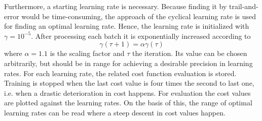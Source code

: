 Furthermore, a starting learning rate is necessary.
Because finding it by trail-and-error would be time-consuming, the approach of the cyclical learning rate is used for finding an optimal learning rate.
Hence, the learning rate is initialized with $\gamma = 10^{-5}$.
After processing each batch it is exponentially increased according to
\begin{equation}
	\gamma(\tau+1) = \alpha \gamma(\tau)
\end{equation}
where $\alpha = 1.1$ is the scaling factor and $\tau$ the iteration.
Its value can be chosen arbitrarily, but should be in range for achieving a desirable precision in learning rates.
For each learning rate, the related cost function evaluation is stored.
Training is stopped when the last cost value is four times the second to last one, i.e. when a drastic deterioration in cost happens.
For evaluation the cost values are plotted against the learning rates.
On the basis of this, the range of optimal learning rates can be read where a steep descent in cost values happen. 